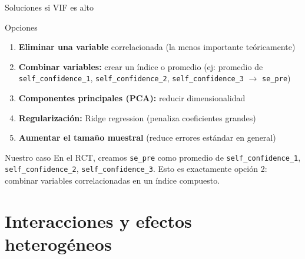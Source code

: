 \documentclass[aspectratio=169, 11pt]{beamer}
\begin{document}
\begin{frame}{Soluciones si VIF es alto}
\begin{alertblock}{Opciones}
\begin{enumerate}
  \item \textbf{Eliminar una variable} correlacionada (la menos importante teóricamente)
  \item \textbf{Combinar variables:} crear un índice o promedio (ej: promedio de \texttt{self\_confidence\_1}, \texttt{self\_confidence\_2}, \texttt{self\_confidence\_3} $\rightarrow$ \texttt{se\_pre})
  \item \textbf{Componentes principales (PCA):} reducir dimensionalidad
  \item \textbf{Regularización:} Ridge regression (penaliza coeficientes grandes)
  \item \textbf{Aumentar el tamaño muestral} (reduce errores estándar en general)
\end{enumerate}
\end{alertblock}

\vspace{0.2cm}
\begin{exampleblock}{Nuestro caso}
\small
En el RCT, creamos \texttt{se\_pre} como promedio de \texttt{self\_confidence\_1}, \texttt{self\_confidence\_2}, \texttt{self\_confidence\_3}. Esto es exactamente opción 2: combinar variables correlacionadas en un índice compuesto.
\end{exampleblock}
\end{frame}

\section{Interacciones y efectos heterogéneos}
\end{document}
